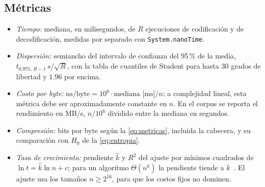 \subsection{Métricas}
\label{sec:metricas}
\begin{itemize}
  \item \emph{Tiempo:} mediana, en milisegundos, de $R$ ejecuciones de codificación y de
        decodificación, medidas por separado con \texttt{System.nanoTime}.
  \item \emph{Dispersión:} semiancho del intervalo de confianza del 95\,\% de la media,
        $t_{0.975,\,R-1}\, s/\sqrt{R}$, con la tabla de cuantiles de Student para hasta 30 grados
        de libertad y $1.96$ por encima.
  \item \emph{Costo por byte:} $\text{ns/byte} = 10^6 \cdot \text{mediana [ms]}/n$; a
        complejidad lineal, esta métrica debe ser aproximadamente constante en $n$. En el corpus
        se reporta el rendimiento en MB/s, $n/10^6$ dividido entre la mediana en segundos.
  \item \emph{Compresión:} bits por byte según la \cref{eq:metricas}, incluida la cabecera, y su
        comparación con $H_0$ de la \cref{eq:entropia}.
  \item \emph{Tasa de crecimiento:} pendiente $\hat{k}$ y $R^2$ del ajuste por mínimos cuadrados
        de $\ln t = \hat{k}\ln n + c$; para un algoritmo $\Theta(n^k)$ la pendiente tiende a
        $k$~\cite{mcgeoch2012}. El ajuste usa los tamaños $n \ge 2^{16}$, para que los costos
        fijos no dominen.
\end{itemize}

